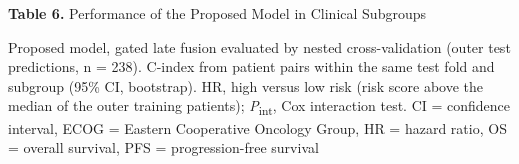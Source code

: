 \documentclass[border=8pt]{standalone}
\newif\ifshowtitle \showtitletrue
\newif\ifshownotes \shownotestrue
\begin{document}
\begin{minipage}{\wd\tablebox}
\ifshowtitle\noindent \textbf{Table 6.} Performance of the Proposed Model in Clinical Subgroups\par\vspace{4pt}\fi
\noindent\usebox\tablebox
\ifshownotes\par\vspace{3pt}\footnotesize\noindent Proposed model, gated late fusion evaluated by nested cross-validation (outer test predictions, n = 238). C-index from patient pairs within the same test fold and subgroup (95\% CI, bootstrap). HR, high versus low risk (risk score above the median of the outer training patients); \textit{P}\textsubscript{int}, Cox interaction test. CI = confidence interval, ECOG = Eastern Cooperative Oncology Group, HR = hazard ratio, OS = overall survival, PFS = progression-free survival\par\fi
\end{minipage}
\end{document}
